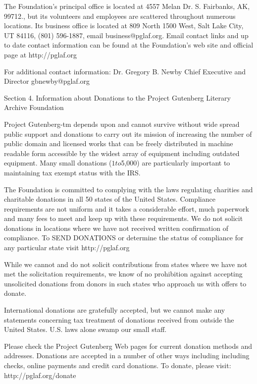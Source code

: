 The Foundation's principal office is located at 4557 Melan Dr. S.
Fairbanks, AK, 99712., but its volunteers and employees are scattered
throughout numerous locations.  Its business office is located at
809 North 1500 West, Salt Lake City, UT 84116, (801) 596-1887, email
business@pglaf.org.  Email contact links and up to date contact
information can be found at the Foundation's web site and official
page at http://pglaf.org

For additional contact information:
     Dr. Gregory B. Newby
     Chief Executive and Director
     gbnewby@pglaf.org


Section 4.  Information about Donations to the Project Gutenberg
Literary Archive Foundation

Project Gutenberg-tm depends upon and cannot survive without wide
spread public support and donations to carry out its mission of
increasing the number of public domain and licensed works that can be
freely distributed in machine readable form accessible by the widest
array of equipment including outdated equipment.  Many small donations
($1 to $5,000) are particularly important to maintaining tax exempt
status with the IRS.

The Foundation is committed to complying with the laws regulating
charities and charitable donations in all 50 states of the United
States.  Compliance requirements are not uniform and it takes a
considerable effort, much paperwork and many fees to meet and keep up
with these requirements.  We do not solicit donations in locations
where we have not received written confirmation of compliance.  To
SEND DONATIONS or determine the status of compliance for any
particular state visit http://pglaf.org

While we cannot and do not solicit contributions from states where we
have not met the solicitation requirements, we know of no prohibition
against accepting unsolicited donations from donors in such states who
approach us with offers to donate.

International donations are gratefully accepted, but we cannot make
any statements concerning tax treatment of donations received from
outside the United States.  U.S. laws alone swamp our small staff.

Please check the Project Gutenberg Web pages for current donation
methods and addresses.  Donations are accepted in a number of other
ways including including checks, online payments and credit card
donations.  To donate, please visit: http://pglaf.org/donate


